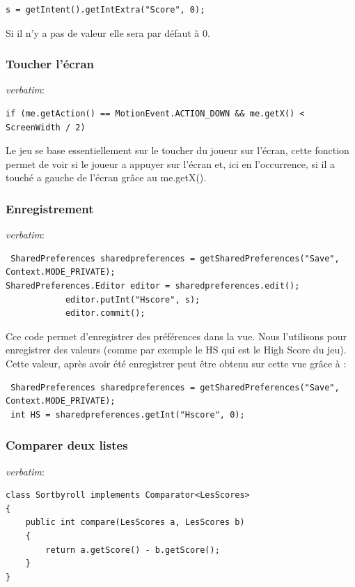 \documentclass{article}
\begin{document}
\begin{verbatim}
s = getIntent().getIntExtra("Score", 0);
\end{verbatim}

Si il n'y a pas de valeur elle sera par défaut à 0.

\subsubsection{Toucher l'écran}
\textit{verbatim}:
\begin{verbatim}
if (me.getAction() == MotionEvent.ACTION_DOWN && me.getX() < ScreenWidth / 2)
\end{verbatim}

Le jeu se base essentiellement sur le toucher du joueur sur l'écran, cette fonction permet de voir si le joueur a appuyer sur l'écran et, ici en l'occurrence, si il a touché a gauche de l'écran grâce au me.getX(). 


\subsubsection{Enregistrement}
\textit{verbatim}:
\begin{verbatim}
 SharedPreferences sharedpreferences = getSharedPreferences("Save", Context.MODE_PRIVATE);
SharedPreferences.Editor editor = sharedpreferences.edit();
            editor.putInt("Hscore", s);
            editor.commit();
\end{verbatim}

Cce code permet d'enregistrer des préférences dans la vue. Nous l'utilisons pour enregistrer des valeurs (comme par exemple le HS qui est le High Score du jeu). Cette valeur, après avoir été enregistrer peut être obtenu sur cette vue grâce à :

\begin{verbatim}
 SharedPreferences sharedpreferences = getSharedPreferences("Save", Context.MODE_PRIVATE);
 int HS = sharedpreferences.getInt("Hscore", 0);
\end{verbatim}


\subsubsection{Comparer deux listes}
\textit{verbatim}:
\begin{verbatim}
class Sortbyroll implements Comparator<LesScores>
{
    public int compare(LesScores a, LesScores b)
    {
        return a.getScore() - b.getScore();
    }
}
\end{verbatim}
\end{document}
